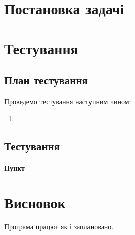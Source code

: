 \nocite{*}
\sffamily

\section{Постановка задачі}

\section{Тестування}
\subsection{План тестування}
Проведемо тестування наступним чином:
\begin{enumerate}
	\item
\end{enumerate}
\subsection{Тестування}
\paragraph{Пункт }


\section{Висновок}
Програма працює як і заплановано.
